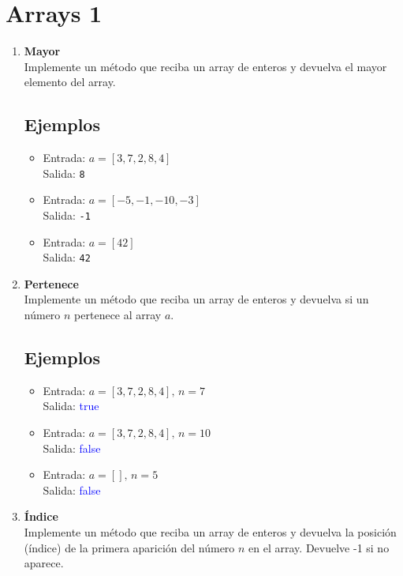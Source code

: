 \section{Arrays 1}
\begin{enumerate}
    \item \textbf{Mayor}\\
    Implemente un método que reciba un array de enteros y devuelva el mayor elemento del array.
    \subsection*{Ejemplos}
    \begin{itemize}
        \item Entrada: \( a = [3, 7, 2, 8, 4] \)\\
        Salida: \texttt{8}
        
        \item Entrada: \( a = [-5, -1, -10, -3] \)\\
        Salida: \texttt{-1}
        
        \item Entrada: \( a = [42] \)\\
        Salida: \texttt{42}
    \end{itemize}
    
    \item \textbf{Pertenece}\\
     Implemente un método que reciba un array de enteros y devuelva si un número \(n\) pertenece al array \(a\).
     \subsection*{Ejemplos}
     \begin{itemize}
        \item Entrada: \( a = [3, 7, 2, 8, 4], \, n = 7 \)\\
        Salida: \textcolor{blue}{true} 
        
        \item Entrada: \( a = [3, 7, 2, 8, 4], \, n = 10 \)\\
        Salida: \textcolor{blue}{false}
        
        \item Entrada: \( a = [], \, n = 5 \)\\
        Salida: \textcolor{blue}{false}
    \end{itemize}
     
    \item \textbf{Índice}\\
     Implemente un método que reciba un array de enteros y devuelva la posición (índice) de la primera aparición del número \(n\) en el array. Devuelve -1 si no aparece.

\end{enumerate}
